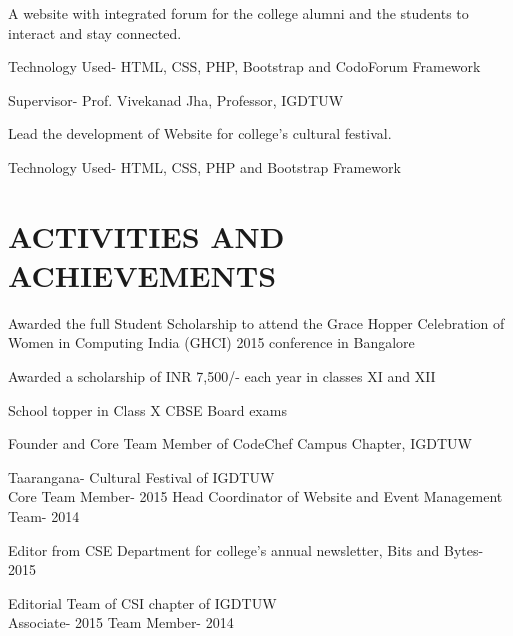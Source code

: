 \documentclass[]{deedy-resume-openfont}
\begin{document}
\begin{minipage}[t]{0.66\textwidth}
A website with integrated forum for the college alumni and the students to interact and stay connected.
\begin{tightemize}
\item Technology Used- HTML, CSS, PHP, Bootstrap and CodoForum Framework
\item Supervisor- Prof. Vivekanad Jha, Professor, IGDTUW
\end{tightemize}
\sectionsep

Lead the development of Website for college’s cultural festival. 
\begin{tightemize}
\item Technology Used- HTML, CSS, PHP and Bootstrap Framework
\end{tightemize}

\sectionsep


\section{ACTIVITIES AND ACHIEVEMENTS}

\begin{tightemize}
\item Awarded the full Student Scholarship to attend the Grace Hopper Celebration of Women in Computing India (GHCI) 2015 conference in Bangalore
\item Awarded a scholarship of INR 7,500/-  each year in classes XI and XII
\item School topper in Class X CBSE Board exams
\end{tightemize}
\sectionsep

\begin{tightemize}
\item Founder and Core Team Member of CodeChef Campus Chapter, IGDTUW
\item Taarangana- Cultural Festival of IGDTUW \\
\textbullet{} Core Team Member- 2015 \textbullet{} Head Coordinator of Website and Event Management Team- 2014
\item Editor from CSE Department for college’s annual newsletter, Bits and Bytes- 2015
\item Editorial Team of CSI chapter of IGDTUW \\
\textbullet{} Associate- 2015 \textbullet{} Team Member- 2014
\end{tightemize}
\sectionsep


\end{minipage}
\end{document}
